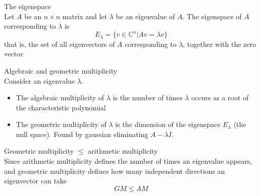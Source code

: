 \documentclass[journal, letterpaper]{IEEEtran}
\begin{document}
    \begin{myboxg}{}
    \end{myboxg}
    \begin{mybox}{The eigenspace} \\ 
        Let $A$ be an $n \times n$ matrix and let $\lambda$ be an eigenvalue of $A$. The eigenspace of $A$ corresponding to $\lambda$ is
        $$ E_\lambda = \{ v \in \mathbb{C}^n | Av = \lambda v\}$$
        that is, the set of all eigenvectors of $A$ corresponding to $\lambda$, together with the zero vector.
    \end{mybox}
    \begin{myboxr}{Algebraic and geometric multiplicity} \\ 
        Consider an eigenvalue $\lambda$.
        \begin{itemize}
            \item The algebraic multiplicity of $\lambda$ is the number of times $\lambda$ occurs as a root of the characteristic polynomial
            \item The geometric multiplicity of $\lambda$ is the dimension of the eigenspace $E_\lambda$ (the null space). Found by gaussian eliminating $A - \lambda I$.
        \end{itemize}
    \end{myboxr}
    \begin{myboxr}{Geometric multiplicity $\le$ arithmetic multiplicity} \\ 
        Since arithmetic multiplicity defines the number of times an eigenvalue appears, and geometric multiplicity
        defines how many independent directions an eigenvector can take
        $$ GM \le AM$$
    \end{myboxr}
\end{document}
